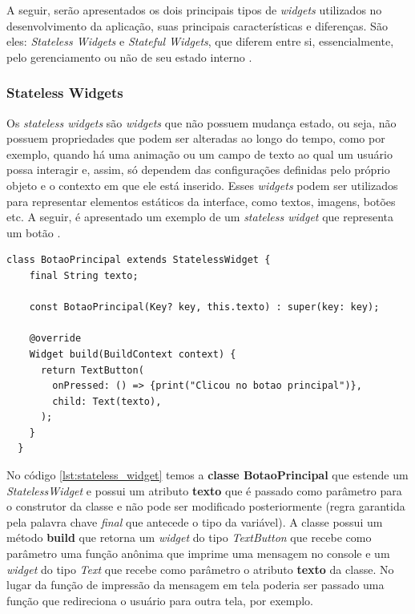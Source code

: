 A seguir, serão apresentados os dois principais tipos de \textit{widgets} utilizados no desenvolvimento da aplicação, suas principais características e diferenças. São eles: \textit{Stateless Widgets} e \textit{Stateful Widgets}, que diferem entre si, essencialmente, pelo gerenciamento ou não de seu estado interno \cite{flutter2022widgets}.

\subsubsection{Stateless Widgets}
\label{cap2:SubSubSec:StatelessWidgets}
Os \textit{stateless widgets} são \textit{widgets} que não possuem mudança estado, ou seja, não possuem propriedades que podem ser alteradas ao longo do tempo, como por exemplo, quando há uma animação ou um campo de texto ao qual um usuário possa interagir e, assim, só dependem das configurações definidas pelo próprio objeto e o contexto em que ele está inserido. Esses \textit{widgets} podem ser utilizados para representar elementos estáticos da interface, como textos, imagens, botões etc. A seguir, é apresentado um exemplo de um \textit{stateless widget} que representa um botão \cite{flutter2022stateless} \cite{stateless2018create}.

\begin{lstlisting}[caption={Exemplo de um \textit{stateless widget} que representa um botão.}, label={lst:stateless_widget}]
  class BotaoPrincipal extends StatelessWidget {
    final String texto;
  
    const BotaoPrincipal(Key? key, this.texto) : super(key: key);
  
    @override
    Widget build(BuildContext context) {
      return TextButton(
        onPressed: () => {print("Clicou no botao principal")},
        child: Text(texto),
      );
    }
  }
\end{lstlisting}

No código \ref{lst:stateless_widget} temos a \textbf{classe BotaoPrincipal} que estende um \textit{StatelessWidget} e possui um atributo \textbf{texto} que é passado como parâmetro para o construtor da classe e não pode ser modificado posteriormente (regra garantida pela palavra chave \textit{final} que antecede o tipo da variável). A classe possui um método \textbf{build} que retorna um \textit{widget} do tipo \textit{TextButton} que recebe como parâmetro uma função anônima que imprime uma mensagem no console e um \textit{widget} do tipo \textit{Text} que recebe como parâmetro o atributo \textbf{texto} da classe. No lugar da função de impressão da mensagem em tela poderia ser passado uma função que redireciona o usuário para outra tela, por exemplo.


